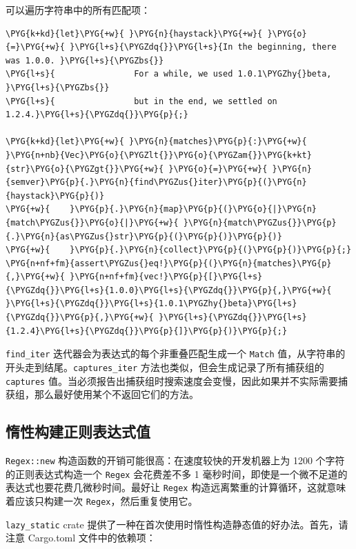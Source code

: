 可以遍历字符串中的所有匹配项：

\begin{Verbatim}[commandchars=\\\{\},breaklines=true,breakanywhere=true,fontsize=\codefont,xleftmargin=17bp]
\PYG{k+kd}{let}\PYG{+w}{ }\PYG{n}{haystack}\PYG{+w}{ }\PYG{o}{=}\PYG{+w}{ }\PYG{l+s}{\PYGZdq{}}\PYG{l+s}{In the beginning, there was 1.0.0. }\PYG{l+s}{\PYGZbs{}}
\PYG{l+s}{                For a while, we used 1.0.1\PYGZhy{}beta, }\PYG{l+s}{\PYGZbs{}}
\PYG{l+s}{                but in the end, we settled on 1.2.4.}\PYG{l+s}{\PYGZdq{}}\PYG{p}{;}

\PYG{k+kd}{let}\PYG{+w}{ }\PYG{n}{matches}\PYG{p}{:}\PYG{+w}{ }\PYG{n+nb}{Vec}\PYG{o}{\PYGZlt{}}\PYG{o}{\PYGZam{}}\PYG{k+kt}{str}\PYG{o}{\PYGZgt{}}\PYG{+w}{ }\PYG{o}{=}\PYG{+w}{ }\PYG{n}{semver}\PYG{p}{.}\PYG{n}{find\PYGZus{}iter}\PYG{p}{(}\PYG{n}{haystack}\PYG{p}{)}
\PYG{+w}{    }\PYG{p}{.}\PYG{n}{map}\PYG{p}{(}\PYG{o}{|}\PYG{n}{match\PYGZus{}}\PYG{o}{|}\PYG{+w}{ }\PYG{n}{match\PYGZus{}}\PYG{p}{.}\PYG{n}{as\PYGZus{}str}\PYG{p}{(}\PYG{p}{)}\PYG{p}{)}
\PYG{+w}{    }\PYG{p}{.}\PYG{n}{collect}\PYG{p}{(}\PYG{p}{)}\PYG{p}{;}
\PYG{n+nf+fm}{assert\PYGZus{}eq!}\PYG{p}{(}\PYG{n}{matches}\PYG{p}{,}\PYG{+w}{ }\PYG{n+nf+fm}{vec!}\PYG{p}{[}\PYG{l+s}{\PYGZdq{}}\PYG{l+s}{1.0.0}\PYG{l+s}{\PYGZdq{}}\PYG{p}{,}\PYG{+w}{ }\PYG{l+s}{\PYGZdq{}}\PYG{l+s}{1.0.1\PYGZhy{}beta}\PYG{l+s}{\PYGZdq{}}\PYG{p}{,}\PYG{+w}{ }\PYG{l+s}{\PYGZdq{}}\PYG{l+s}{1.2.4}\PYG{l+s}{\PYGZdq{}}\PYG{p}{]}\PYG{p}{)}\PYG{p}{;}
\end{Verbatim}

\texttt{find\_iter} 迭代器会为表达式的每个非重叠匹配生成一个 \texttt{Match} 值，从字符串的开头走到结尾。\texttt{captures\_iter} 方法也类似，但会生成记录了所有捕获组的 \texttt{captures} 值。当必须报告出捕获组时搜索速度会变慢，因此如果并不实际需要捕获组，那么最好使用某个不返回它们的方法。

\subsection{惰性构建正则表达式值}

\texttt{Regex::new} 构造函数的开销可能很高：在速度较快的开发机器上为 1200 个字符的正则表达式构造一个 \texttt{Regex} 会花费差不多 1 毫秒时间，即使是一个微不足道的表达式也要花费几微秒时间。最好让 \texttt{Regex} 构造远离繁重的计算循环，这就意味着应该只构建一次 \texttt{Regex}，然后重复使用它。

\texttt{lazy\_static} crate 提供了一种在首次使用时惰性构造静态值的好办法。首先，请注意 Cargo.toml 文件中的依赖项：

